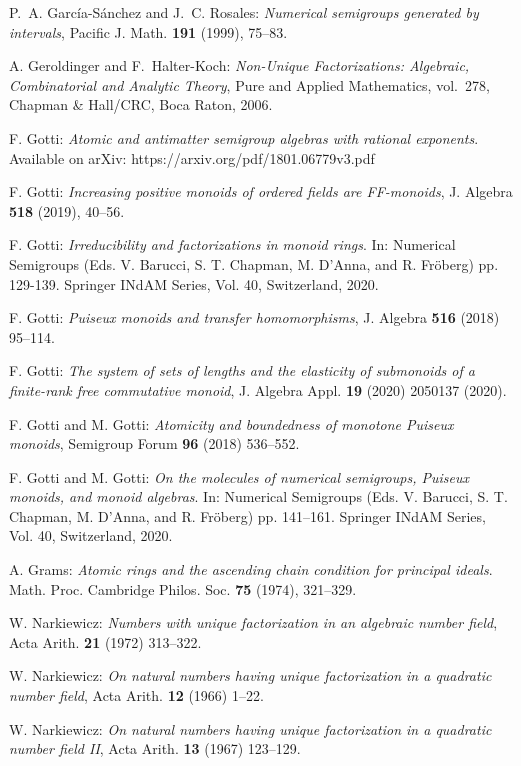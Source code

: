 \documentclass[12pt]{amsart}
\theoremstyle{definition}
\numberwithin{equation}{section}
\begin{document}
\begin{thebibliography}{20}
	 P.~A. Garc\'ia-S\'anchez and J.~C. Rosales: \emph{Numerical semigroups generated by intervals}, Pacific J. Math. {\bf 191} (1999), 75--83.
	
	 A. Geroldinger and F.~Halter-Koch: \emph{Non-Unique Factorizations: Algebraic, Combinatorial and Analytic Theory}, Pure and Applied Mathematics, vol.~278, Chapman \& Hall/CRC, Boca Raton, 2006.
	
	 F. Gotti: \emph{Atomic and antimatter semigroup algebras with rational exponents}. Available on arXiv: https://arxiv.org/pdf/1801.06779v3.pdf
		
	 F. Gotti: \emph{Increasing positive monoids of ordered fields are FF-monoids}, J. Algebra {\bf 518} (2019), 40--56.

	 F. Gotti: \emph{Irreducibility and factorizations in monoid rings}. In: Numerical Semigroups (Eds. V. Barucci, S. T. Chapman, M. D'Anna, and R. Fröberg) pp. 129-139. Springer INdAM Series, Vol. 40, Switzerland, 2020.


	 F. Gotti: \emph{Puiseux monoids and transfer homomorphisms}, J. Algebra \textbf{516} (2018) 95--114.

	 F. Gotti: \emph{The system of sets of lengths and the elasticity of submonoids of a finite-rank free commutative monoid}, J. Algebra Appl. \textbf{19} (2020) 2050137 (2020).

	 F. Gotti and M. Gotti: \emph{Atomicity and boundedness of monotone Puiseux monoids}, Semigroup Forum {\bf 96} (2018) 536--552.

	 F. Gotti and M. Gotti: \emph{On the molecules of numerical semigroups, Puiseux monoids, and monoid algebras}. In: Numerical Semigroups (Eds. V. Barucci, S. T. Chapman, M. D'Anna, and R. Fröberg) pp. 141--161. Springer INdAM Series, Vol. 40, Switzerland, 2020.


	 A. Grams: \emph{Atomic rings and the ascending chain condition for principal ideals}. Math. Proc. Cambridge Philos. Soc. {\bf 75} (1974), 321--329.
	
	 W. Narkiewicz: \emph{Numbers with unique factorization in an algebraic number field}, Acta Arith. {\bf 21} (1972) 313--322. 
	
	 W. Narkiewicz: \emph{On natural numbers having unique factorization in a quadratic number field}, Acta Arith. {\bf 12} (1966) 1--22.
	
	 W. Narkiewicz: \emph{On natural numbers having unique factorization in a quadratic number field II}, Acta Arith. {\bf 13} (1967) 123--129.

\end{thebibliography}
	
\end{document}
